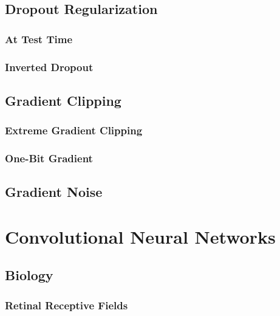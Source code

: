 	\section{Dropout Regularization} %

		\subsection{At Test Time} %

		\subsection{Inverted Dropout} %

	\section{Gradient Clipping} %

		\subsection{Extreme Gradient Clipping} %

		\subsection{One-Bit Gradient} %

	\section{Gradient Noise} %

\chapter{Convolutional Neural Networks} %

	\section{Biology} %

		\subsection{Retinal Receptive Fields} %

